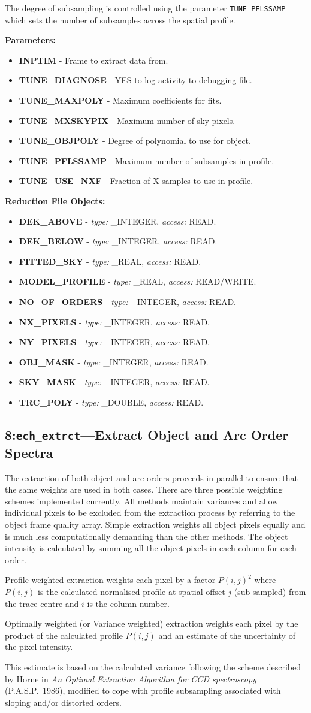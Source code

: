 \documentclass[11pt,twoside]{article}
\makeatletter
\newcommand{\stardocinitials}  {SUN}
\newcommand{\stardocnumber}    {152.4}
\newcommand{\stardocname}{\stardocinitials /\stardocnumber}
\newcommand{\htmlref}[2]{#1}
\newcommand{\xlabel}[1]{}
\newcommand{\myindex}[1]{\index{#1}}
\newcommand{\indexcmdname}[1]{\index{#1@\protect\cmdname{#1}}}
\renewcommand{\myindex}[1]{}
\renewcommand{\indexcmdname}[1]{}
\newcommand{\cmdname}{\begingroup \catcode`\_=12 \realcmdname}
\newcommand{\realcmdname}[1]{\endgroup\texttt{#1}}
\newlength{\sstbannerlength}
\newlength{\sstcaptionlength}
\newcommand{\echtask}[4]{
   \goodbreak
   \rule{\textwidth}{0.5mm}
   \vspace{-7ex}
   \newline
   \settowidth{\sstbannerlength}{{\Large {\bf #3}}}
   \setlength{\sstcaptionlength}{\textwidth}
   \addtolength{\sstbannerlength}{0.5em}
   \addtolength{\sstcaptionlength}{-2.0\sstbannerlength}
   \addtolength{\sstcaptionlength}{-5.0pt}
   \parbox[t]{\sstbannerlength}{\flushleft{\Large {\bf #3}}}
   \parbox[t]{\sstcaptionlength}{\center{\Large #4}}
   \parbox[t]{\sstbannerlength}{\flushright{\Large {\bf #3}}}
   \label{#1}\label{#2}
   \markboth{#3}{\stardocname}
   \uppercase{\myindex{#2@\protect\cmdname{#2}}}
}
\renewcommand{\echtask}[4]
{
  \subsection{\xlabel{#1}\xlabel{#2}\label{#1}\label{#2}#3---#4}
  \markboth{#3}{\stardocname}
}
\newcommand{\echpars}[1]{
{\bf Parameters:\vspace*{6pt}\\}
    #1
}
\renewcommand{\echpars}[1]{
{\bf Parameters:}
\begin{itemize}
#1
\end{itemize}
}
\newcommand{\epar}[3]
{
    \hspace*{5mm}\makebox[50mm][l]{\bf #1} #2 (p~\pageref{par_#3}.)\\
}
\renewcommand{\epar}[3]
{\item \htmlref{{\bf #1}}{par_#3} - #2}
\newcommand{\lepar}[3]
{
    \hspace*{5mm}\makebox[50mm][l]{\bf #1} #2 (p~\pageref{par_#3}.)
}
\renewcommand{\lepar}[3]
{\item \htmlref{{\bf #1}}{par_#3} - #2}
\newcommand{\echredobj}[1]{
{\bf Reduction File Objects:\vspace*{6pt}\\}
      \hspace*{5mm}\makebox[50mm][l]{Object}\makebox[25mm][l]{Type}{Access}\\
      #1
}
\renewcommand{\echredobj}[1]{
{\bf Reduction File Objects:}
\begin{itemize}
#1
\end{itemize}
}
\newcommand{\eobj}[3]
{
    \hspace*{5mm}\makebox[50mm][l]{\bf #1}\makebox[25mm][l]{\tt #2}{\tt #3}\\
}
\renewcommand{\eobj}[3]
{\item {\bf #1} - {\it type:} #2, {\it access:} #3.}
\newcommand{\leobj}[3]
{
    \hspace*{5mm}\makebox[50mm][l]{\bf #1}\makebox[25mm][l]{\tt #2}{\tt #3}
}
\renewcommand{\leobj}[3]
{\item {\bf #1} - {\it type:} #2, {\it access:} #3.}
\makeatother
\begin{document}
\myindex{Spatial subsampling}
\indexcmdname{TUNE_PFLSSAMP}
The degree of subsampling is controlled using the parameter
\htmlref{{\tt TUNE\_PFLSSAMP}}{par_TUNE_PFLSSAMP} which sets the number of
subsamples across the spatial profile.

\echpars{
\epar{INPTIM}{Frame to extract data from.}{INPTIM}
\epar{TUNE\_DIAGNOSE}{YES to log activity to debugging file.}{TUNE_DIAGNOSE}
\epar{TUNE\_MAXPOLY}{Maximum coefficients for fits.}{TUNE_MAXPOLY}
\epar{TUNE\_MXSKYPIX}{Maximum number of sky-pixels.}{TUNE_MXSKYPIX}
\epar{TUNE\_OBJPOLY}{Degree of polynomial to use for object.}{TUNE_OBJPOLY}
\epar{TUNE\_PFLSSAMP}{Maximum number of subsamples in profile.}{TUNE_PFLSSAMP}
\lepar{TUNE\_USE\_NXF}{Fraction of X-samples to use in profile.}{TUNE_USE_NXF}
}

\echredobj{
\eobj{DEK\_ABOVE}{\_INTEGER}{READ}
\eobj{DEK\_BELOW}{\_INTEGER}{READ}
\eobj{FITTED\_SKY}{\_REAL}{READ}
\eobj{MODEL\_PROFILE}{\_REAL}{READ/WRITE}
\eobj{NO\_OF\_ORDERS}{\_INTEGER}{READ}
\eobj{NX\_PIXELS}{\_INTEGER}{READ}
\eobj{NY\_PIXELS}{\_INTEGER}{READ}
\eobj{OBJ\_MASK}{\_INTEGER}{READ}
\eobj{SKY\_MASK}{\_INTEGER}{READ}
\leobj{TRC\_POLY}{\_DOUBLE}{READ}
}


\echtask{option8}{ech_extrct}{8:{\tt ech\_extrct}}{Extract Object and Arc
  Order Spectra}
\myindex{Extraction}

The extraction of both object and arc orders proceeds in parallel to ensure
that the same weights are used in both cases. There are three possible
weighting schemes implemented currently. All methods maintain variances and
allow individual pixels to be excluded from the extraction process by
referring to the object frame quality array.\myindex{Weighting!during extraction}
Simple extraction weights all object pixels equally and is much less
computationally demanding than the other methods. The object intensity is
calculated by summing all the object pixels in each column for each order.

Profile weighted extraction weights each pixel by a factor $P(i,j)^{2}$ where
$P(i,j)$ is the calculated normalised profile at spatial offset $j$
(sub-sampled) from the trace centre and $i$ is the column number.

Optimally weighted (or Variance weighted) extraction weights each pixel by
the product of the calculated profile $P(i,j)$ and an estimate of the
uncertainty of the pixel intensity.

This estimate is based on the calculated variance following the scheme
described by Horne in {\sl An Optimal Extraction Algorithm for CCD
spectroscopy}
(P.A.S.P.~1986), modified to cope with profile subsampling associated with
sloping and/or distorted orders.
\end{document}
